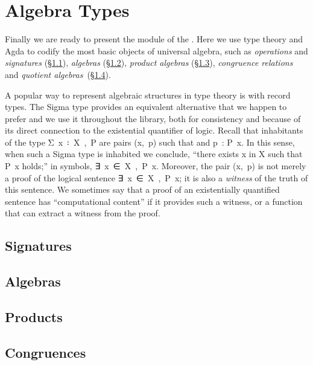 \section{Algebra Types}\label{sec:algebra-types}
Finally we are ready to present the  module of the \agdaualib. Here we use type theory and Agda to codify the most basic objects of universal algebra, such as \emph{operations} and \emph{signatures} (\S\ref{sec:oper-sign}), \emph{algebras} (\S\ref{sec:algebras}), \emph{product algebras} (\S\ref{sec:product-algebras}), \emph{congruence relations} and \emph{quotient algebras}~(\S\ref{congruences}).

A popular way to represent algebraic structures in type theory is with record types. The Sigma type provides an equivalent alternative that we happen to prefer and we use it throughout the library, both for consistency and because of its direct connection to the existential quantifier of logic. Recall that inhabitants of the type \ad Σ~\ab x~\af ꞉~\ab X~\af ,~\ab P are pairs (\ab x,~\ab p) such that  and \ab p~\as : \ab P~\ab x. In this sense, when such a Sigma type is inhabited we conclude, ``there exists \ab x in \ab X such that \ab P~\ab x holds;'' in symbols, \as ∃~\ab x~\af ∈~\ab X~\af ,~\ab P~\ab x.  %
Moreover, the pair (\ab x,~\ab p) is not merely a proof of the logical sentence \as ∃~\ab x~\af ∈~\ab X~\af ,~\ab P~\ab x; it is also a \emph{witness} of the truth of this sentence. We sometimes say that a proof of an existentially quantified sentence has ``computational content'' if it provides such a witness, or a function that can extract a witness from the proof.

\subsection{Signatures}\label{sec:oper-sign}


\subsection{Algebras}\label{sec:algebras}


\subsection{Products}\label{sec:product-algebras}


\subsection{Congruences}\label{congruences}

